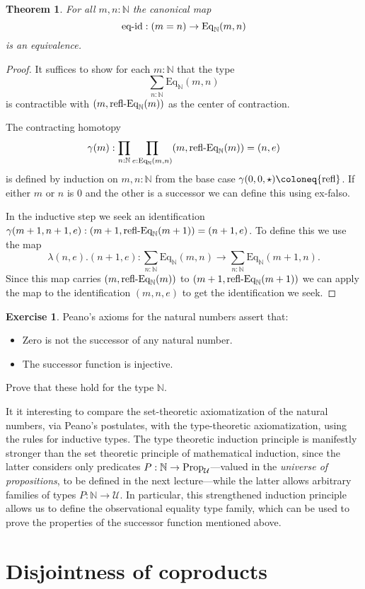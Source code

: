 \documentclass{amsart}
\theoremstyle{theorem}
\newtheorem*{thm}{Theorem}
\theoremstyle{definition}
\newtheorem*{exc}{Exercise}
\theoremstyle{remark}
\newcommand{\0}{\mathbbe{0}}
\newcommand{\1}{\mathbbe{1}}
\newcommand{\2}{\mathbbe{2}}
\newcommand{\3}{\mathbbe{3}}
\newcommand{\4}{\mathbbe{4}}
\newcommand{\term}[1]{{\textup{#1}}}
\newcommand{\type}[1]{{\textup{#1}}}
\newcommand{\bN}{{\mathbb{N}}}
\newcommand{\refl}{\term{refl}}
\newcommand{\UU}{{\mathcal{U}}}
\newcommand{\Eq}{\mathrm{Eq}}
\newcommand{\Prop}{\type{Prop}_{\UU}}
\begin{document}
\begin{thm} For all $m,n : \bN$ the canonical map
\[ \term{eq-id} : (m=n) \to \Eq_\bN(m,n)\] is an equivalence.
\end{thm}
\begin{proof}
It suffices to show for each $m : \bN$ that the type \[ \sum_{n : \bN} \Eq_\bN(m,n)\] is contractible with $(m,\term{refl-Eq}_\bN(m))$ as the center of contraction.

The contracting homotopy
\[ \gamma(m) : \prod_{n :\bN} \prod_{e :\Eq_\bN(m,n)} (m,\term{refl-Eq}_\bN(m)) = (n,e)\]
is defined by induction on $m,n : \bN$ from the base case $\gamma(0,0, \star) \coloneq \refl$. If either $m$ or $n$ is 0 and the other is a successor we can define this using ex-falso.

In the inductive step we seek an identification $\gamma(m+1,n+1,e) : (m+1, \term{refl-Eq}_\bN(m+1)) = (n+1,e)$. To define this we use the map
\[ \lambda(n,e).(n+1,e) : \sum_{n:\bN}\Eq_\bN(m,n) \to \sum_{n : \bN}\Eq_\bN(m+1,n).\]
Since this map carries $(m,\term{refl-Eq}_\bN(m))$ to $(m+1,\term{refl-Eq}_\bN(m+1))$ we can apply the map to the identification $(m,n,e)$ to get the identification we seek.
\end{proof}

\begin{exc} Peano's axioms for the natural numbers assert that:
\begin{itemize}
\item Zero is not the successor of any natural number.
\item The successor function is injective.
\end{itemize}
Prove that these hold for the type $\bN$.
\end{exc}

It it interesting to compare the set-theoretic axiomatization of the natural numbers, via Peano's postulates, with the type-theoretic axiomatization, using the rules for inductive types. The type theoretic induction principle is manifestly stronger than the set theoretic principle of mathematical induction, since the latter considers only predicates $P : \bN \to \Prop$---valued in the \emph{universe of propositions}, to be defined in the next lecture---while the latter allows arbitrary families of types $P \colon \bN \to \UU$. In particular, this strengthened induction principle allows us to define the observational equality type family, which can be used to prove the properties of the successor function mentioned above.

\section*{Disjointness of coproducts}
\end{document}
